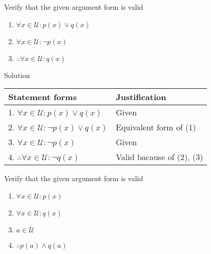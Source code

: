 \begin{longfbox}
    \begin{bt} \label{pro:practice2.32}
        Verify that the given argument form is valid
        \begin{enumerate}
            \item[] $\forall x \in \mathcal U: p(x) \lor q(x)$
            \item[] $\forall x \in \mathcal U: \neg p(x)$
            \item[] $\therefore \forall x \in \mathcal U: q(x)$
        \end{enumerate}
    \end{bt}
\end{longfbox}

Solution
\begin{table}[hbt!]
    \centering
    \begin{tabular}{|l | l|} 
    \hline
    Statement forms & Justification\\ [0.5ex] 
    \hline
        1. $\forall x \in \mathcal U: p(x) \lor q(x)$ & Given \\
        2. $\forall x \in \mathcal U: \neg p(x) \lor q(x)$ & Equivalent form of (1) \\
        3. $\forall x \in \mathcal U: \neg p(x)$ & Given \\
        4. $\therefore \forall x \in \mathcal U: \neg q(x)$ & Valid bacause of (2), (3) \\
    \hline
    \end{tabular}
\end{table}

\newpage
\begin{longfbox}
    \begin{bt} \label{pro:practice2.33}
        Verify that the given argument form is valid
        \begin{enumerate}
            \item[] $\forall x \in \mathcal U: p(x)$
            \item[] $\forall x \in \mathcal U: q(x)$
            \item[] $a \in \mathcal U$
            \item[] $\therefore p(a) \land q(a)$
        \end{enumerate}
    \end{bt}
\end{longfbox}

